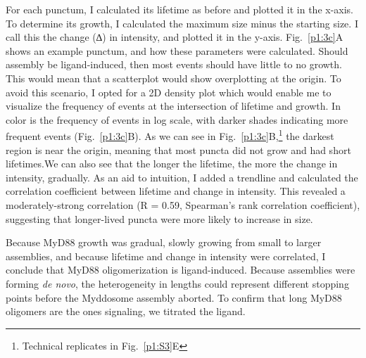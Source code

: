 For each punctum, I calculated its lifetime as before and plotted it in the x-axis. To determine its growth, I calculated the maximum size minus the starting size. I call this the change (∆) in intensity, and plotted it in the y-axis. Fig.~\ref{p1:3c}A shows an example punctum, and how these parameters were calculated.  Should assembly be ligand-induced, then most events should have little to no growth. This would mean that a scatterplot would show overplotting at the origin. To avoid this scenario, I opted for a 2D density plot which would enable me to visualize the frequency of events at the intersection of lifetime and growth. In color is the frequency of events in log scale, with darker shades indicating more frequent events (Fig.~\ref{p1:3c}B). As we can see in Fig.~\ref{p1:3c}B,\footnote{Technical replicates in Fig.~\ref{p1:S3}E}  the darkest region is near the origin, meaning that most puncta did not grow and had short lifetimes.We can also see that the longer the lifetime, the more the change in intensity, gradually. As an aid to intuition, I added a trendline and calculated the correlation coefficient between lifetime and change in intensity.  This revealed a moderately-strong correlation (R = 0.59, Spearman’s rank correlation coefficient), suggesting that longer-lived puncta were more likely to increase in size.

Because MyD88 growth was gradual, slowly growing from small to larger assemblies, and because lifetime and change in intensity were correlated, I conclude that MyD88 oligomerization is ligand-induced. Because assemblies were forming \emph{de novo}, the heterogeneity in lengths could represent different stopping points before the Myddosome assembly aborted. To confirm that long MyD88 oligomers are the ones signaling, we titrated the ligand.



